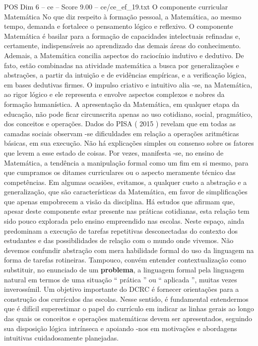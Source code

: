 \begin{textsample}{POS Dim 6 – ce – Score 9.00 – ce/ce\_ef\_19.txt}  \label{ex:f6_pos_038}
O componente curricular Matemática No que diz respeito à formação pessoal, a Matemática, ao mesmo tempo, demanda e fortalece o pensamento lógico e reflexivo.
O componente Matemática é basilar para a formação de capacidades intelectuais refinadas e, certamente, indispensáveis ao aprendizado das demais áreas do conhecimento.
Ademais, a Matemática concilia aspectos do raciocínio indutivo e dedutivo.
De fato, estão combinadas na atividade matemática a busca por generalizações e abstrações, a partir da intuição e de evidências empíricas, e a verificação lógica, em bases dedutivas firmes.
O impulso criativo e intuitivo alia -se, na Matemática, ao rigor lógico e ele representa e envolve aspectos complexos e nobres da formação humanística.
A apresentação da Matemática, em qualquer etapa da educação, não pode ficar circunscrita apenas ao uso cotidiano, social, pragmático, dos conceitos e operações.
Dados do PISA ( 2015 ) revelam que em todas as camadas sociais observam -se dificuldades em relação a operações aritméticas básicas, em sua execução.
Não há explicações simples ou consenso sobre os fatores que levem a esse estado de coisas.
Por vezes, manifesta -se, no ensino de Matemática, a tendência a manipulação formal como um fim em si mesmo, para que cumpramos os ditames curriculares ou o aspecto meramente técnico das competências.
Em algumas ocasiões, evitamos, a qualquer custo a abstração e a generalização, que são características da Matemática, em favor de simplificações que apenas empobrecem a visão da disciplina.
Há estudos que afirmam que, apesar deste componente estar presente nas práticas cotidianas, esta relação tem sido pouco explorada pelo ensino empreendido nas escolas.
Neste espaço, ainda predominam a execução de tarefas repetitivas desconectadas do contexto dos estudantes e das possibilidades de relação com o mundo onde vivemos.
Não devemos confundir abstração com mera habilidade formal do uso da linguagem na forma de tarefas rotineiras.
Tampouco, convém entender contextualização como substituir, no enunciado de um \textbf{problema}, a linguagem formal pela linguagem natural em termos de uma situação “ prática ” ou “ aplicada ”, muitas vezes inverossímil.
Um objetivo importante do DCRC é fornecer orientações para a construção dos currículos das escolas.
Nesse sentido, é fundamental entendermos que é difícil superestimar o papel do currículo em indicar as linhas gerais ao longo das quais os conceitos e operações matemáticas devem ser apresentados, seguindo sua disposição lógica intrínseca e apoiando -nos em motivações e abordagens intuitivas cuidadosamente planejadas.

\end{textsample}

